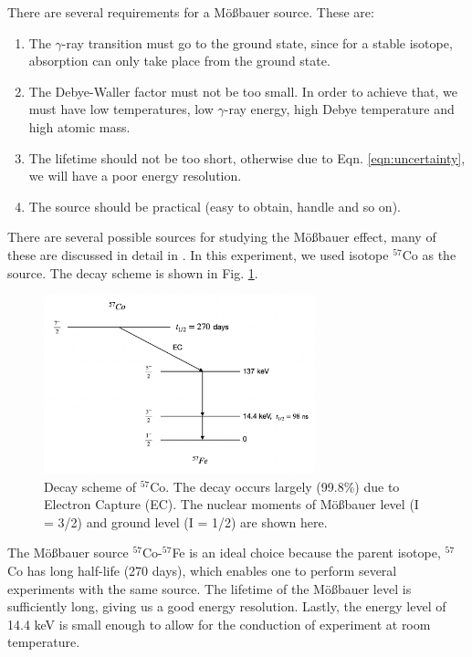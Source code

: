 \documentclass[a4paper]{report}
\numberwithin{equation}{section}
\begin{document}
There are several requirements for a M\"o{\ss}bauer source. These are: 

\begin{enumerate}
		\item The $\gamma$-ray transition must go to the ground state, since for a stable isotope, absorption can only take place from the ground state.
		\item The Debye-Waller factor must not be too small. In order to achieve that, we must have low temperatures, low $\gamma$-ray energy, high Debye temperature and high atomic mass.
		\item The lifetime should not be too short, otherwise due to Eqn. \ref{eqn:uncertainty}, we will have a poor energy resolution.
		\item The source should be practical (easy to obtain, handle and so on).
\end{enumerate}

There are several possible sources for studying the M\"o{\ss}bauer effect, many of these are discussed in detail in \cite{Schatz1996}. In this experiment, we used isotope $^{57}$Co as the source. The decay scheme is shown in Fig. \ref{fig:decay}.

\begin{figure}[htpb]
    \centering
    \includegraphics[width=0.7\textwidth]{source}
    \caption{Decay scheme of $^{57}$Co. The decay occurs largely (99.8\%) due to Electron Capture (EC). The nuclear moments of M\"o{\ss}bauer level (I = 3/2) and ground level (I = 1/2) are shown here.}
    \label{fig:decay}
\end{figure}	

The M\"o{\ss}bauer source $^{57}$Co-$^{57}$Fe is an ideal choice because the parent isotope, $^{57}$Co has long half-life (270 days), which enables one to perform several experiments with the same source. The lifetime of the M\"o{\ss}bauer level is sufficiently long, giving us a good energy resolution. Lastly, the energy level of 14.4 keV is small enough to allow for the conduction of experiment at room temperature. 
\end{document}
